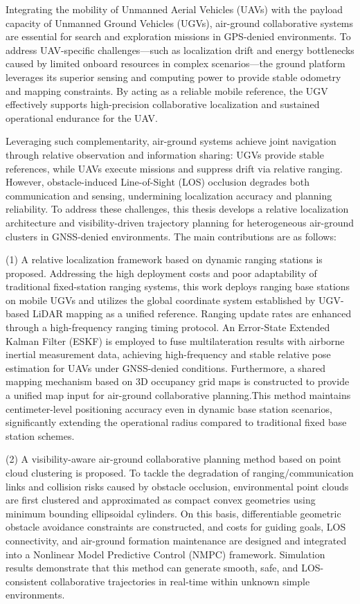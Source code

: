 \cleardoublepage
{}

Integrating the mobility of Unmanned Aerial Vehicles (UAVs) with the payload capacity of Unmanned Ground Vehicles (UGVs), air-ground collaborative systems are essential for search and exploration missions in GPS-denied environments. To address UAV-specific challenges—such as localization drift and energy bottlenecks caused by limited onboard resources in complex scenarios—the ground platform leverages its superior sensing and computing power to provide stable odometry and mapping constraints. By acting as a reliable mobile reference, the UGV effectively supports high-precision collaborative localization and sustained operational endurance for the UAV.

Leveraging such complementarity, air-ground systems achieve joint navigation through relative observation and information sharing: UGVs provide stable references, while UAVs execute missions and suppress drift via relative ranging. However, obstacle-induced Line-of-Sight (LOS) occlusion degrades both communication and sensing, undermining localization accuracy and planning reliability. To address these challenges, this thesis develops a relative localization architecture and visibility-driven trajectory planning for heterogeneous air-ground clusters in GNSS-denied environments. The main contributions are as follows:

(1) A relative localization framework based on dynamic ranging stations is proposed. Addressing the high deployment costs and poor adaptability of traditional fixed-station ranging systems, this work deploys ranging base stations on mobile UGVs and utilizes the global coordinate system established by UGV-based LiDAR mapping as a unified reference. Ranging update rates are enhanced through a high-frequency ranging timing protocol. An Error-State Extended Kalman Filter (ESKF) is employed to fuse multilateration results with airborne inertial measurement data, achieving high-frequency and stable relative pose estimation for UAVs under GNSS-denied conditions. Furthermore, a shared mapping mechanism based on 3D occupancy grid maps is constructed to provide a unified map input for air-ground collaborative planning.This method maintains centimeter-level positioning accuracy even in dynamic base station scenarios, significantly extending the operational radius compared to traditional fixed base station schemes.

(2) A visibility-aware air-ground collaborative planning method based on point cloud clustering is proposed. To tackle the degradation of ranging/communication links and collision risks caused by obstacle occlusion, environmental point clouds are first clustered and approximated as compact convex geometries using minimum bounding ellipsoidal cylinders. On this basis, differentiable geometric obstacle avoidance constraints are constructed, and costs for guiding goals, LOS connectivity, and air-ground formation maintenance are designed and integrated into a Nonlinear Model Predictive Control (NMPC) framework. Simulation results demonstrate that this method can generate smooth, safe, and LOS-consistent collaborative trajectories in real-time within unknown simple environments.

